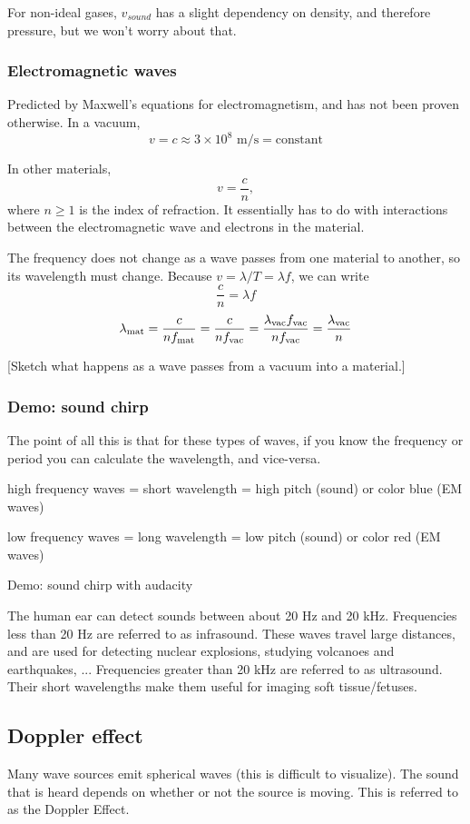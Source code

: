For non-ideal gases, $v_{sound}$ has a slight dependency on density, and therefore pressure, but we won't worry about that.

\subsubsection{Electromagnetic waves}
Predicted by Maxwell's equations for electromagnetism, and has not been proven otherwise. 
In a vacuum,
$$v=c\approx 3\times 10^8\mbox{ m/s}=\mbox{constant}$$

In other materials, 
$$v=\frac{c}{n},$$
where $n\geq 1$ is the index of refraction. It essentially has to do with interactions between the electromagnetic wave and electrons in the material.

The frequency does not change as a wave passes from one material to another, so its wavelength must change.
Because $v=\lambda/T=\lambda f$, we can write
$$\frac{c}{n}=\lambda f$$
$$\lambda_{\rm mat} = \frac{c}{nf_{\rm mat}}=\frac{c}{nf_{\rm vac}}=\frac{\lambda_{\rm vac}f_{\rm vac}}{nf_{\rm vac}}=\frac{\lambda_{\rm vac}}{n}$$

[Sketch what happens as a wave passes from a vacuum into a material.]
\vspace{3cm}


\subsubsection{Demo: sound chirp}
The point of all this is that for these types of waves, if you know the frequency or period you can calculate the wavelength, and vice-versa.

high frequency waves = short wavelength = high pitch (sound) or color blue (EM waves)

low frequency waves = long wavelength = low pitch (sound) or color red (EM waves)

Demo: sound chirp with audacity

The human ear can detect sounds between about 20 Hz and 20 kHz. Frequencies less than 20 Hz are referred to as infrasound. These waves travel large distances, and are used for detecting nuclear explosions, studying volcanoes and earthquakes, ... Frequencies greater than 20 kHz are referred to as ultrasound. Their short wavelengths make them useful for imaging soft tissue/fetuses.


\subsection{Doppler effect}
Many wave sources emit spherical waves (this is difficult to visualize). The sound that is heard depends on whether or not the source is moving. This is referred to as the Doppler Effect.

